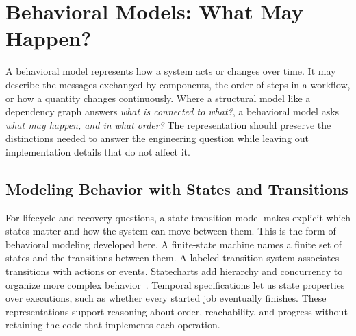 


\chapter{Behavioral Models: What May Happen?}

A behavioral model represents how a system acts or changes over time. It may describe the messages exchanged by components, the order of steps in a workflow, or how a quantity changes continuously. Where a structural model like a dependency graph answers \emph{what is connected to what?}, a behavioral model asks \emph{what may happen, and in what order?} The representation should preserve the distinctions needed to answer the engineering question while leaving out implementation details that do not affect it.

\section{Modeling Behavior with States and Transitions}\label{heading:modeling-behavior-with-states-and-transitions}


For lifecycle and recovery questions, a state-transition model makes explicit which states matter and how the system can move between them. This is the form of behavioral modeling developed here. A finite-state machine names a finite set of states and the transitions between them. A labeled transition system associates transitions with actions or events. Statecharts add hierarchy and concurrency to organize more complex behavior~\citep{harel1987}. Temporal specifications let us state properties over executions, such as whether every started job eventually finishes. These representations support reasoning about order, reachability, and progress without retaining the code that implements each operation.

